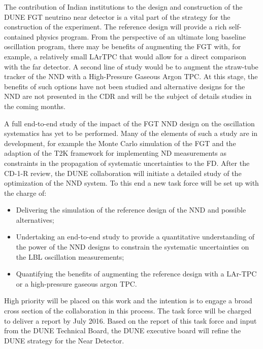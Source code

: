 The contribution of Indian institutions to the design and construction
of the DUNE FGT neutrino near detector is a vital part of the strategy
for the construction of the experiment. The reference design will
provide a rich self-contained physics program. From the perspective of
an ultimate long baseline oscillation program, there may be benefits
of augmenting the FGT with, for example, a relatively small LArTPC
that would allow for a direct comparison with the far detector.  A
second line of study would be to augment the straw-tube tracker of the
NND with a High-Pressure Gaseous Argon TPC. At this stage, the
benefits of such options have not been studied and alternative designs
for the NND are not presented in the CDR and will be the subject of
details studies in the coming months.

A full end-to-end study of the impact of the FGT NND design on the
oscillation systematics has yet to be performed. Many of the elements
of such a study are in development, for example the Monte Carlo
simulation of the FGT and the adaption of the T2K framework for
implementing ND measurements as constraints in the propagation of
systematic uncertainties to the FD.  After the CD-1-R review, the DUNE
collaboration will initiate a detailed study of the optimization of
the NND system. To this end a new task force will be set up with the
charge of:
\begin{itemize}
\item Delivering the simulation of the reference design of the NND and
  possible alternatives;
\item Undertaking an end-to-end study to provide a quantitative
  understanding of the power of the NND designs to constrain the
  systematic uncertainties on the LBL oscillation measurements;
\item Quantifying the benefits of augmenting the reference design with
  a LAr-TPC or a high-pressure gaseous argon TPC.
\end{itemize}
High priority will be placed on this work and the intention is to engage a broad 
cross section of the collaboration in this process. The task force will be charged 
to deliver a report by July 2016. Based on the report of this task force and input 
from the DUNE Technical Board, the DUNE executive board will refine the DUNE strategy 
for the Near Detector.
